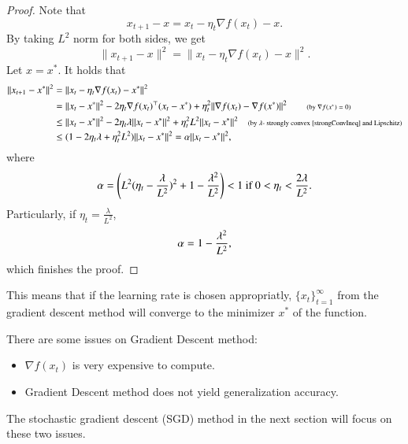 \begin{proof}
	Note that 
	\begin{equation}
	x_{t+1} - x =  x_{t} - \eta_t \nabla f(x_t)  - x.
	\end{equation}
	By taking $L^2$ norm for both sides, we get 
	\begin{equation}
	\|x_{t+1} - x \|^2 = \|x_{t} - \eta_t \nabla f(x_t) - x \|^2.
	\end{equation}
	Let $x = x^*$. It holds that
	\begin{equation}
	\begin{aligned}
	\|x_{t+1} - x^* \|^2 &=  \| x_{t} - \eta_t \nabla f(x_t) - x^* \|^2 \\
	&= \|x_t-x^*\|^2 - 2\eta_t \nabla f(x_t)^\top (x_t - x^*) + \eta_t^2 \|\nabla f(x_t) - \nabla f(x^*)\|^2 \qquad \mbox{\scriptsize (by $\nabla f(x^*)=0$)}\\
	&\le \|x_t - x^*\|^2 - 2\eta_t \lambda \|x_t - x^*\|^2 + \eta_t ^2 L^2 \|x_t - x^*\|^2  \quad \mbox{\scriptsize (by $\lambda$- strongly convex \eqref{strongConvIneq} and Lipschitz)}\\
	&\le (1 - 2\eta_t \lambda + \eta_t^2 L^2) \|x_t - x^*\|^2
	=\alpha \|x_t - x^*\|^2,
	\end{aligned}
	\end{equation}
	where
	$$
	\alpha = \left(L^2 (\eta_t  -{\lambda\over L^2})^2 + 1-{\lambda^2\over L^2}\right)<1\  \mbox{if } 0< \eta_t<\frac{2\lambda}{L^2}.
	$$ 
	Particularly, if $\eta_t =\frac{\lambda}{L^2}$,
	$$
	\alpha=1-{\lambda^2\over L^2},
	$$
	which finishes the proof. 
\end{proof}
This means that if the learning rate is chosen appropriatly, $\{x_t\}_{t=1}^\infty$ from the gradient descent method will converge to the minimizer $x^*$ of the function.

There are some issues on Gradient Descent method:
\begin{itemize}
\item $\nabla f(x_{t})$ is very expensive to compute.
\item Gradient Descent method does not yield generalization accuracy.
\end{itemize}
The stochastic gradient descent (SGD) method in the next section will focus on these two issues.
